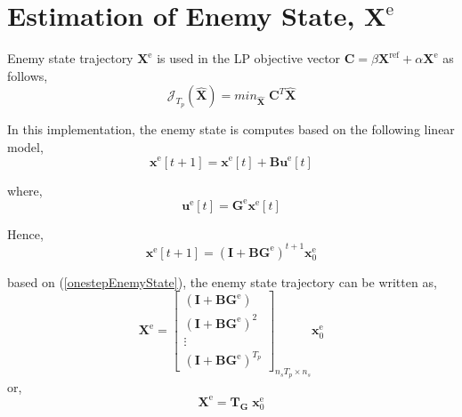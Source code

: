 \documentclass{article}
\begin{document}
\section{Estimation of Enemy State, $\mathbf{X}^{\text{e}}$}
Enemy state trajectory $\mathbf{X}^{\text{e}}$ is used in the LP objective vector $\mathbf{C} = \beta \mathbf{X}^{\text{ref}} + \alpha \mathbf{X}^{\text{e}}$ as follows,
\begin{equation}
\mathcal{J}_{T_p}(\hat{\mathbf{X}}) = min_{\hat{\mathbf{X}} }\; \mathbf{C}^T \hat{\mathbf{X}}
\end{equation}

In this implementation, the enemy state is computes based on the following linear model,
\begin{equation}
\mathbf{x}^{\text{e}}[t+1] = \mathbf{x}^{\text{e}}[t] + \mathbf{B}\mathbf{u}^{\text{e}}[t]
\end{equation}

where,
\begin{equation}
\mathbf{u}^{\text{e}}[t] = \mathbf{G}^{\text{e}} \mathbf{x}^{\text{e}}[t]
\end{equation}

Hence,
\begin{equation}
\label{onestepEnemyState}
\mathbf{x}^{\text{e}}[t+1] = (\mathbf{I} + \mathbf{BG}^{\text{e}})^{t+1} \mathbf{x}^{\text{e}}_0
\end{equation}

based on (\ref{onestepEnemyState}), the enemy state trajectory can be written as,
\begin{equation}
\mathbf{X}^{\text{e}} = 
\begin{bmatrix}
(\mathbf{I} + \mathbf{BG}^{\text{e}}) \\
(\mathbf{I} + \mathbf{BG}^{\text{e}})^{2} \\
\vdots \\
(\mathbf{I} + \mathbf{BG}^{\text{e}})^{T_p}
\end{bmatrix}_{n_s T_p \times n_s}
\mathbf{x}^{\text{e}}_0
\end{equation}
or,
\[
\mathbf{X}^{\text{e}} =\mathbf{T}_{\mathbf{G}} \; \mathbf{x}^{\text{e}}_0
\]
\end{document}
